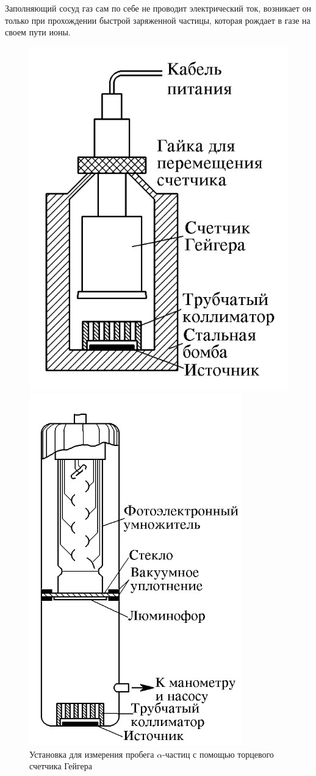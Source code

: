 \documentclass[14pt, a4paper]{report}
\begin{document}
Заполняющий сосуд газ сам по себе не проводит электрический ток, возникает он только при прохождении быстрой заряженной частицы, которая рождает в газе на своем пути ионы.

\captionsetup{width=.25\textwidth}
\begin{figure}[H]
\centering
\begin{minipage}{.3\textwidth}
  \centering
  \includegraphics[width=.7\linewidth]{../images/541-1}
  \caption{Установка для измерения пробега $\alpha$-частиц с помощью торцевого счетчика Гейгера}
\end{minipage}%
\begin{minipage}{.3\textwidth}
  \centering
  \includegraphics[width=.7\linewidth]{../images/541-2}

\end{minipage}
\end{figure}
\end{document}

